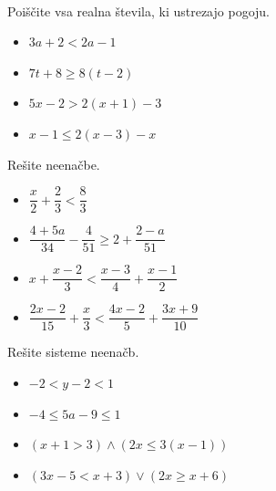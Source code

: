         
~~~



        
                
                    \begin{naloga}
                        Poiščite vsa realna števila, ki ustrezajo pogoju.
                        \begin{itemize}
                                \item $3a+2<2a-1$ 
                                \item $7t+8\geq 8(t-2)$ 
                                \item $5x-2>2(x+1)-3$ 
                                \item $x-1\leq 2(x-3)-x$ 
                        \end{itemize}
                    \end{naloga}
                
        
        
                
                    \begin{naloga}
                        Rešite neenačbe.
                        \begin{itemize}
                                \item $\dfrac{x}{2}+\dfrac{2}{3}<\dfrac{8}{3}$ 
                                \item $\dfrac{4+5a}{34}-\dfrac{4}{51}\geq 2+\dfrac{2-a}{51}$ 
                                \item $x+\dfrac{x-2}{3}<\dfrac{x-3}{4}+\dfrac{x-1}{2}$ 
                                \item $\dfrac{2x-2}{15}+\dfrac{x}{3}<\dfrac{4x-2}{5}+\dfrac{3x+9}{10}$ 
                        \end{itemize}
                    \end{naloga}
                
        
        
        
                
                    \begin{naloga}
                        Rešite sisteme neenačb.
                        \begin{itemize}
                                \item $-2<y-2<1$ 
                                \item $-4\leq 5a-9\leq 1$ 
                                \item $(x+1>3)\land (2x\leq 3(x-1))$ 
                                \item $(3x-5<x+3)\lor (2x\geq x+6)$ 
                        \end{itemize}
                    \end{naloga}
                
